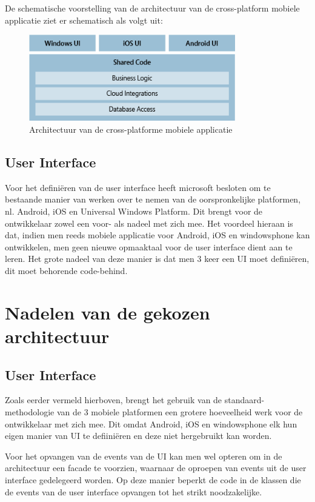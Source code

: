 De schematische voorstelling van de architectuur van de cross-platform mobiele applicatie ziet er schematisch als volgt uit:
\begin{figure}[ht!]
\centering
\caption{Architectuur van de cross-platforme mobiele applicatie}
\includegraphics[width=90mm]{./img/architecture.png}
\end{figure}

\subsection{User Interface}
Voor het definiëren van de user interface heeft microsoft besloten om te bestaande manier van werken over te nemen van de oorspronkelijke platformen, nl. Android, iOS en Universal Windows Platform.
Dit brengt voor de ontwikkelaar zowel een voor- als nadeel met zich mee. Het voordeel hieraan is dat, indien men reeds mobiele applicatie voor Android, iOS en windowsphone kan ontwikkelen, men geen
nieuwe opmaaktaal voor de user interface dient aan te leren. Het grote nadeel van deze manier is dat men 3 keer een UI moet definiëren,
dit moet behorende code-behind.

\label{sec:nadelenvandegekozenapparchitectuur}
\section{Nadelen van de gekozen architectuur}
\subsection{User Interface}
Zoals eerder vermeld hierboven, brengt het gebruik van de standaard-methodologie van de 3 mobiele platformen een grotere hoeveelheid
werk voor de ontwikkelaar met zich mee. Dit omdat Android, iOS en windowsphone elk hun eigen manier van UI te defiiniëren en deze niet hergebruikt kan worden.

Voor het opvangen van de events van de UI kan men wel opteren om in de architectuur een facade te voorzien, waarnaar de oproepen van events uit de user interface gedelegeerd worden.
Op deze manier beperkt de code in de klassen die de events van de user interface opvangen tot het strikt noodzakelijke.
\label{sec:appkosten}
